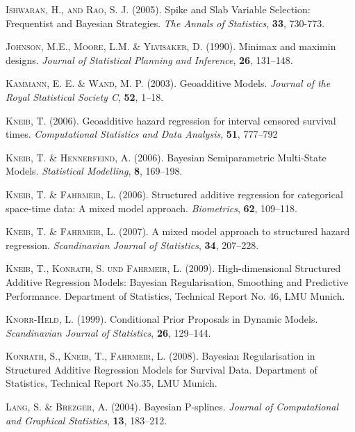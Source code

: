 \documentclass[11pt,a4paper,twoside]{bayesxarticle}
\begin{document}
\begin{thebibliography}{99}
 {\scshape Ishwaran, H., and Rao, S. J.} (2005). Spike and Slab Variable
 Selection: Frequentist and Bayesian Strategies. {\it The Annals of Statistics},
 {\bf 33}, 730-773.

 {\scshape Johnson, M.E., Moore, L.M. \& Ylvisaker, D.} (1990).
 Minimax and maximin designs.
 {\it Journal of Statistical Planning and Inference}, {\bf 26}, 131--148.

 {\scshape Kammann, E. E. \& Wand, M. P.} (2003).
 Geoadditive Models.
 {\it Journal of the Royal Statistical Society C}, {\bf 52}, 1--18.

 {\scshape Kneib, T.} (2006).
 Geoadditive hazard regression for interval censored survival times.
 {\it Computational Statistics and Data Analysis}, {\bf 51}, 777--792

 {\scshape Kneib, T. \& Hennerfeind, A.} (2006).
 Bayesian Semiparametric Multi-State Models.
 {\it Statistical Modelling}, {\bf 8}, 169--198.

 {\scshape Kneib, T. \& Fahrmeir, L.} (2006).
 Structured additive regression for categorical space-time data: A mixed model approach.
 {\it Biometrics}, {\bf 62}, 109--118.

 {\scshape Kneib, T. \& Fahrmeir, L.} (2007).
 A mixed model approach to structured hazard regression.
 {\it Scandinavian Journal of Statistics}, {\bf 34}, 207--228.

 {\scshape Kneib, T., Konrath, S. und Fahrmeir, L.} (2009). High-dimensional
 Structured Additive Regression Models: Bayesian Regularisation, Smoothing and Predictive
 Performance. Department of Statistics, Technical Report No. 46, LMU Munich.

 {\scshape Knorr-Held, L.} (1999).
 Conditional Prior Proposals in Dynamic Models.
 {\it Scandinavian Journal of Statistics}, {\bf 26}, 129--144.

 {\scshape Konrath, S., Kneib, T., Fahrmeir, L.} (2008). Bayesian Regularisation
 in Structured Additive Regression Models for Survival Data. Department of Statistics,
 Technical Report No.35, LMU Munich.

 {\scshape Lang, S. \& Brezger, A.} (2004).
 Bayesian P-splines.
 {\it Journal of Computational and Graphical Statistics}, {\bf 13}, 183--212.


\end{thebibliography}
\end{document}
